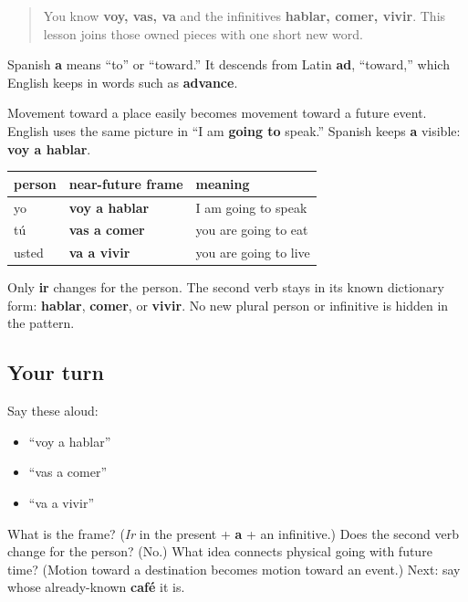 \begin{quote}
You know \textbf{voy, vas, va} and the infinitives \textbf{hablar, comer, vivir}. This lesson joins those owned pieces with one short new word.
\end{quote}

\begin{cousinweb}
Spanish \textbf{a} means “to” or “toward.” It descends from Latin \textbf{ad}, “toward,” which English keeps in words such as \textbf{advance}.

Movement toward a place easily becomes movement toward a future event. English uses the same picture in “I am \textbf{going to} speak.” Spanish keeps \textbf{a} visible: \textbf{voy a hablar}.
\end{cousinweb}

\begin{grammarlens}[title={Grammar Lens: ir + a + an unchanged infinitive}]
\noindent
\begin{tabularx}{\linewidth}{@{}>{\raggedright\arraybackslash}X>{\raggedright\arraybackslash}X>{\raggedright\arraybackslash}X@{}}
\toprule
\textbf{person} & \textbf{near-future frame} & \textbf{meaning} \\
\midrule
yo & \textbf{voy a hablar} & I am going to speak \\
tú & \textbf{vas a comer} & you are going to eat \\
usted & \textbf{va a vivir} & you are going to live \\
\bottomrule
\end{tabularx}

Only \textbf{ir} changes for the person. The second verb stays in its known dictionary form: \textbf{hablar}, \textbf{comer}, or \textbf{vivir}. No new plural person or infinitive is hidden in the pattern.
\end{grammarlens}

\subsection*{Your turn}
Say these aloud:

\begin{itemize}
\raggedright
  \item “voy a hablar”
  \item “vas a comer”
  \item “va a vivir”
\end{itemize}

\begin{tcolorbox}[breakable,colback=teal!4,colframe=teal!35!black,title={Before you move on}]
What is the frame? (\emph{Ir} in the present + \textbf{a} + an infinitive.) Does the second verb change for the person? (No.) What idea connects physical going with future time? (Motion toward a destination becomes motion toward an event.) Next: say whose already-known \textbf{café} it is.
\end{tcolorbox}
